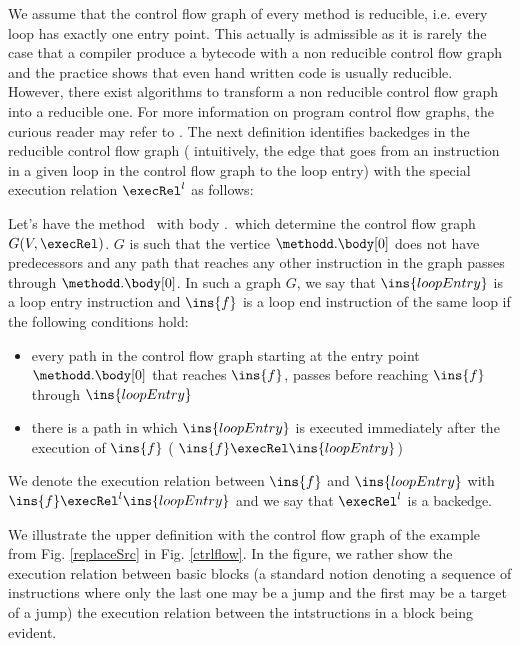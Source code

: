 We assume that the control flow graph of every method is reducible, i.e. every loop has exactly one entry point. This actually is admissible
as it is rarely the case that a compiler produce a bytecode with a non reducible control flow graph and the practice shows that even hand written
code is usually reducible. However, there exist algorithms to transform a non reducible control flow graph into a reducible one. 
For more information on program control flow graphs, the curious reader may refer to \cite{ARUCom1986}.
The next definition identifies backedges in the reducible control flow graph ( intuitively, the edge that goes 
from an instruction in a given loop in the control flow graph to the loop entry)  with the special execution relation $\execRel^l$ as follows:
 
\begin{defLoop}
\label{defLoop}
Let's have the method \methodd \ with body \methodd.\body \ which determine the control flow graph $G(V, \execRel) $.  $G$ is such that 
the vertice  $\methodd.\body[0]$ does not have predecessors and any path that reaches any other instruction in the graph
passes through $\methodd.\body[0]$. In such a graph $G$, we say that $\ins{loopEntry}$ is a loop entry instruction and $\ins{f}$ is a loop end instruction
 of the same loop if the following conditions hold:
\begin{itemize}
\item every path in the control flow graph starting at the entry point $\methodd.\body[0]$  that reaches $\ins{f}$, passes before reaching $\ins{f}$
 through  $\ins{loopEntry}$ 
\item there is a path in which $\ins{loopEntry}$  is executed immediately after the execution of $\ins{f}$ ( $\ins{f} \execRel \ins{loopEntry}$)
\end{itemize}
We denote the execution relation between $\ins{f}$ and  $\ins{loopEntry}$ with \\
$\ins{f} \execRel^l \ins{loopEntry}$ and we say that $  \execRel^l $  is a backedge. 
\end{defLoop}
We illustrate the upper definition with the control flow graph of the example from Fig. \ref{replaceSrc} in Fig. \ref{ctrlflow}.
In the figure, we rather show the execution relation between basic blocks (a standard notion denoting a sequence of instructions where
only the last one may be a jump and the first may be a target of a jump) the execution relation between the 
intstructions in a block being evident.


